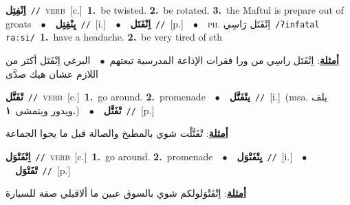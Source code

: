 \documentclass[10pt,a4paper,twoside]{article} %
\begin{document}
\begin{multicols}{2}
{{{{{{\setlength\topsep{0pt}\textbf{\foreignlanguage{arabic}{اِنْفِتِل}}\ {\color{gray}\texttt{//}\color{black}}\ \textsc{verb}\ [c.]\ \textbf{1.}~be twisted.  \textbf{2.}~be rotated.  \textbf{3.}~the Maftul is prepare out of groats\ \ $\bullet$\ \ \setlength\topsep{0pt}\textbf{\foreignlanguage{arabic}{يِنْفِتِل}}\ {\color{gray}\texttt{//}\color{black}}\ [i.]\ \ $\bullet$\ \ \setlength\topsep{0pt}\textbf{\foreignlanguage{arabic}{اِنْفَتَل}}\ {\color{gray}\texttt{//}\color{black}}\ [p.]\ \ $\bullet$\ \ \textsc{ph.} \color{gray} \foreignlanguage{arabic}{اِنْفَتَل رَاسِي}\color{black}\ {\color{gray}\texttt{/{\sffamily ʔinfatal raːsi}/}\color{black}}\ \textbf{1.}~have a headache.  \textbf{2.}~be very tired of sth\  \begin{flushright}\color{gray}\foreignlanguage{arabic}{\textbf{\underline{\foreignlanguage{arabic}{أمثلة}}}: اِنْفَتَل راسِي من ورا فقرات الإذاعة المدرسية تبعتهم\ $\bullet$\ \  البرغي اِنْفَتَل أكثر من اللازم عشان هيك صدَّى}\end{flushright}\color{black}} \vspace{2mm}

{\setlength\topsep{0pt}\textbf{\foreignlanguage{arabic}{تْفَتَّل}}\ {\color{gray}\texttt{//}\color{black}}\ \textsc{verb}\ [c.]\ \textbf{1.}~go around.  \textbf{2.}~promenade\ \ $\bullet$\ \ \setlength\topsep{0pt}\textbf{\foreignlanguage{arabic}{يتْفَتَّل}}\ {\color{gray}\texttt{//}\color{black}}\ [i.]\ \color{gray}(msa. \foreignlanguage{arabic}{يلف ويدور ويتمشى}~\foreignlanguage{arabic}{\textbf{١.}})\color{black}\ \ $\bullet$\ \ \setlength\topsep{0pt}\textbf{\foreignlanguage{arabic}{تْفَتَّل}}\ {\color{gray}\texttt{//}\color{black}}\ [p.]\  \begin{flushright}\color{gray}\foreignlanguage{arabic}{\textbf{\underline{\foreignlanguage{arabic}{أمثلة}}}: تْفَتَّلْت شوي بالمطبخ والصالة قبل ما يجوا الجماعة}\end{flushright}\color{black}} \vspace{2mm}

{\setlength\topsep{0pt}\textbf{\foreignlanguage{arabic}{اِتْفَتْوَل}}\ {\color{gray}\texttt{//}\color{black}}\ \textsc{verb}\ [c.]\ \textbf{1.}~go around.  \textbf{2.}~promenade\ \ $\bullet$\ \ \setlength\topsep{0pt}\textbf{\foreignlanguage{arabic}{يِتْفَتْوَل}}\ {\color{gray}\texttt{//}\color{black}}\ [i.]\ \ $\bullet$\ \ \setlength\topsep{0pt}\textbf{\foreignlanguage{arabic}{تْفَتْوَل}}\ {\color{gray}\texttt{//}\color{black}}\ [p.]\  \begin{flushright}\color{gray}\foreignlanguage{arabic}{\textbf{\underline{\foreignlanguage{arabic}{أمثلة}}}: اِتْفَتْوَلولكم شوي بالسوق عبين ما ألاقيلي صفة للسيارة}\end{flushright}\color{black}} \vspace{2mm}

}}}}}
\end{multicols}
\end{document}
